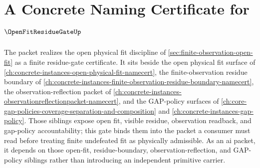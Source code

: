 \chapter{A Concrete Naming Certificate for $\OpenFitResidueGateUp$}
\label{ch:concrete-instances-open-fit-residue-gate-namecert}

The \OpenFitResidueGateUp packet realizes the open physical fit discipline of \autoref{sec:finite-observation-open-fit} as a finite residue-gate certificate. It sits beside the open physical fit surface of \autoref{ch:concrete-instances-open-physical-fit-namecert}, the finite-observation residue boundary of \autoref{ch:concrete-instances-finite-observation-residue-boundary-namecert}, the observation-reflection packet of \autoref{ch:concrete-instances-observationreflectionpacket-namecert}, and the GAP-policy surfaces of \autoref{ch:core-gap-policies-coverage-separation-and-composition} and \autoref{ch:concrete-instances-gap-policy}. Those siblings expose open fit, visible residue, observation readback, and gap-policy accountability; this gate binds them into the packet a consumer must read before treating finite undefeated fit as physically admissible.
As an ai packet, it depends on those open-fit, residue-boundary, observation-reflection, and GAP-policy siblings rather than introducing an independent primitive carrier.

